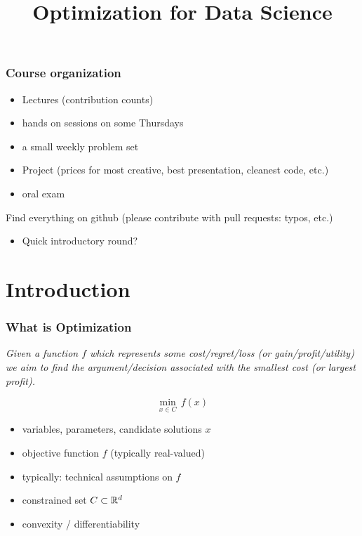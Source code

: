 \documentclass{beamer}
\title{Optimization for Data Science}
\begin{document}
\maketitle
\frame{\tableofcontents}

\begin{frame}
  \frametitle{Course organization}
  \begin{itemize}
    \item Lectures (contribution counts)
    \item hands on sessions on some Thursdays
    \item a small weekly problem set
    \item Project (prices for most creative, best presentation, cleanest code, etc.)
    \item oral exam
  \end{itemize}

  Find everything on github (please contribute with pull requests: typos, etc.)

  \begin{itemize}
    \item Quick introductory round?
  \end{itemize}

\end{frame}



\section{Introduction}

\begin{frame}
  \frametitle{What is Optimization}

  \begin{center}
    \textit{Given a function $f$ which represents some cost/regret/loss (or gain/profit/utility) we aim to find the argument/decision associated with the smallest cost (or largest profit).}
  \end{center}

  \begin{equation}
    \min_{x\in C } \, f(x)
  \end{equation}

  \begin{itemize}
    \item variables, parameters, candidate solutions $x$
    \item objective function $f$ (typically real-valued)
    \item typically: technical assumptions on $f$
    \item constrained set $C \subset \mathbb{R}^d$
    \item convexity / differentiability
  \end{itemize}
\end{frame}
\end{document}
